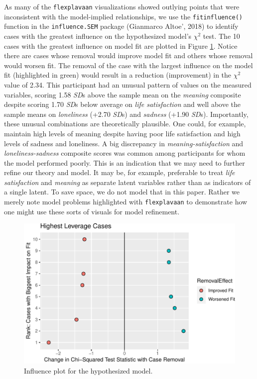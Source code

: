 \documentclass[
  english,
  man]{apa6}
\begin{document}
As many of the \texttt{flexplavaan} visualizations showed outlying points that were inconsistent with the model-implied relationships, we use the \texttt{fitinfluence()} function in the \texttt{influence.SEM} package (Gianmarco Altoe', 2018) to identify cases with the greatest influence on the hypothesized model's \(\chi^2\) test. The 10 cases with the greatest influence on model fit are plotted in Figure \ref{fig:influence}. Notice there are cases whose removal would improve model fit and others whose removal would worsen fit. The removal of the case with the largest influence on the model fit (highlighted in green) would result in a reduction (improvement) in the \(\chi^2\) value of 2.34. This participant had an unusual pattern of values on the measured variables, scoring 1.58 \emph{SD}s above the sample mean on the \emph{meaning} composite despite scoring 1.70 \emph{SD}s below average on \emph{life satisfaction} and well above the sample means on \emph{loneliness} (+2.70 \emph{SD}s) and \emph{sadness} (+1.90 \emph{SD}s). Importantly, these unusual combinations are theoretically plausible. One could, for example, maintain high levels of meaning despite having poor life satisfaction and high levels of sadness and loneliness. A big discrepancy in \emph{meaning-satisfaction} and \emph{loneliness-sadness} composite scores was common among participants for whom the model performed poorly. This is an indication that we may need to further refine our theory and model. It may be, for example, preferable to treat \emph{life satisfaction} and \emph{meaning} as separate latent variables rather than as indicators of a single latent. To save space, we do not model that in this paper. Rather we merely note model problems highlighted with \texttt{flexplavaan} to demonstrate how one might use these sorts of visuals for model refinement.

\begin{figure}

{\centering \includegraphics[width=0.6\linewidth]{flexplavaan_draft_files/figure-latex/influence-1} 

}

\caption{Influence plot for the hypothesized model.}\label{fig:influence}
\end{figure}
\end{document}
